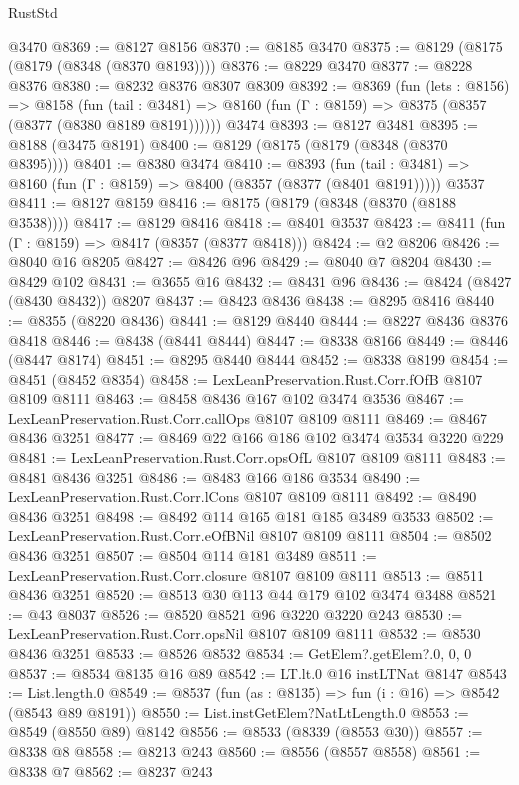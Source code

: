 \begin{lexlean}{RustStd}
\begin{coremodule}
{\begin{coremodule}
{{{{{{{{{{{{{{{{{{{{{{{{{{{{{{{{{{{{{{{{{{{{{    @3470
@8369 := @8127 @8156
@8370 := @8185 @3470
@8375 := @8129 (@8175 (@8179 (@8348 (@8370 @8193))))
@8376 := @8229 @3470
@8377 := @8228 @8376
@8380 := @8232 @8376 @8307 @8309
@8392 := @8369
    (fun (lets : @8156) =>
    @8158
      (fun (tail : @3481) => @8160 (fun (Γ : @8159) => @8375 (@8357 (@8377 (@8380 @8189 @8191))))))
    @3474
@8393 := @8127 @3481
@8395 := @8188 (@3475 @8191)
@8400 := @8129 (@8175 (@8179 (@8348 (@8370 @8395))))
@8401 := @8380 @3474
@8410 := @8393
    (fun (tail : @3481) => @8160 (fun (Γ : @8159) => @8400 (@8357 (@8377 (@8401 @8191)))))
    @3537
@8411 := @8127 @8159
@8416 := @8175 (@8179 (@8348 (@8370 (@8188 @3538))))
@8417 := @8129 @8416
@8418 := @8401 @3537
@8423 := @8411 (fun (Γ : @8159) => @8417 (@8357 (@8377 @8418)))
@8424 := @2 @8206
@8426 := @8040 @16 @8205
@8427 := @8426 @96
@8429 := @8040 @7 @8204
@8430 := @8429 @102
@8431 := @3655 @16
@8432 := @8431 @96
@8436 := @8424 (@8427 (@8430 @8432)) @8207
@8437 := @8423 @8436
@8438 := @8295 @8416
@8440 := @8355 (@8220 @8436)
@8441 := @8129 @8440
@8444 := @8227 @8436 @8376 @8418
@8446 := @8438 (@8441 @8444)
@8447 := @8338 @8166
@8449 := @8446 (@8447 @8174)
@8451 := @8295 @8440 @8444
@8452 := @8338 @8199
@8454 := @8451 (@8452 @8354)
@8458 := LexLeanPreservation.Rust.Corr.fOfB @8107 @8109 @8111
@8463 := @8458 @8436 @167 @102 @3474 @3536
@8467 := LexLeanPreservation.Rust.Corr.callOps @8107 @8109 @8111
@8469 := @8467 @8436 @3251
@8477 := @8469 @22 @166 @186 @102 @3474 @3534 @3220 @229
@8481 := LexLeanPreservation.Rust.Corr.opsOfL @8107 @8109 @8111
@8483 := @8481 @8436 @3251
@8486 := @8483 @166 @186 @3534
@8490 := LexLeanPreservation.Rust.Corr.lCons @8107 @8109 @8111
@8492 := @8490 @8436 @3251
@8498 := @8492 @114 @165 @181 @185 @3489 @3533
@8502 := LexLeanPreservation.Rust.Corr.eOfBNil @8107 @8109 @8111
@8504 := @8502 @8436 @3251
@8507 := @8504 @114 @181 @3489
@8511 := LexLeanPreservation.Rust.Corr.closure @8107 @8109 @8111
@8513 := @8511 @8436 @3251
@8520 := @8513 @30 @113 @44 @179 @102 @3474 @3488
@8521 := @43 @8037
@8526 := @8520 @8521 @96 @3220 @3220 @243
@8530 := LexLeanPreservation.Rust.Corr.opsNil @8107 @8109 @8111
@8532 := @8530 @8436 @3251
@8533 := @8526 @8532
@8534 := GetElem?.getElem?.{0, 0, 0}
@8537 := @8534 @8135 @16 @89
@8542 := LT.lt.{0} @16 instLTNat @8147
@8543 := List.length.{0}
@8549 := @8537 (fun (as : @8135) => fun (i : @16) => @8542 (@8543 @89 @8191))
@8550 := List.instGetElem?NatLtLength.{0}
@8553 := @8549 (@8550 @89) @8142
@8556 := @8533 (@8339 (@8553 @30))
@8557 := @8338 @8
@8558 := @8213 @243
@8560 := @8556 (@8557 @8558)
@8561 := @8338 @7
@8562 := @8237 @243
}}}}}}}}}}}}}}}}}}}}}}}}}}}}}}}}}}}}}}}}}}}}}
\end{coremodule}}
\end{coremodule}
\end{lexlean}

